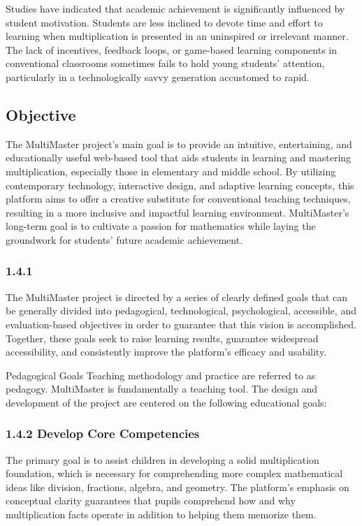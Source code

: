 \documentclass[BTech]{audiss}
\begin{document}
Studies have indicated that academic achievement is significantly influenced by student motivation. Students are less inclined to devote time and effort to learning when multiplication is presented in an uninspired or irrelevant manner. The lack of incentives, feedback loops, or game-based learning components in conventional classrooms sometimes fails to hold young students' attention, particularly in a technologically savvy generation accustomed to rapid.

\subsection{Objective}
The MultiMaster project's main goal is to provide an intuitive, entertaining, and educationally useful web-based tool that aids students in learning and mastering multiplication, especially those in elementary and middle school. By utilizing contemporary technology, interactive design, and adaptive learning concepts, this platform aims to offer a creative substitute for conventional teaching techniques, resulting in a more inclusive and impactful learning environment. MultiMaster's long-term goal is to cultivate a passion for mathematics while laying the groundwork for students' future academic achievement.
\subsubsection {1.4.1}
The MultiMaster project is directed by a series of clearly defined goals that can be generally divided into pedagogical, technological, psychological, accessible, and evaluation-based objectives in order to guarantee that this vision is accomplished. Together, these goals seek to raise learning results, guarantee widespread accessibility, and consistently improve the platform's efficacy and usability.

Pedagogical Goals Teaching methodology and practice are referred to as pedagogy. MultiMaster is fundamentally a teaching tool. The design and development of the project are centered on the following educational goals:

\subsubsection{1.4.2 Develop Core Competencies}
The primary goal is to assist children in developing a solid multiplication foundation, which is necessary for comprehending more complex mathematical ideas like division, fractions, algebra, and geometry. The platform's emphasis on conceptual clarity guarantees that pupils comprehend how and why multiplication facts operate in addition to helping them memorize them.
\end{document}
